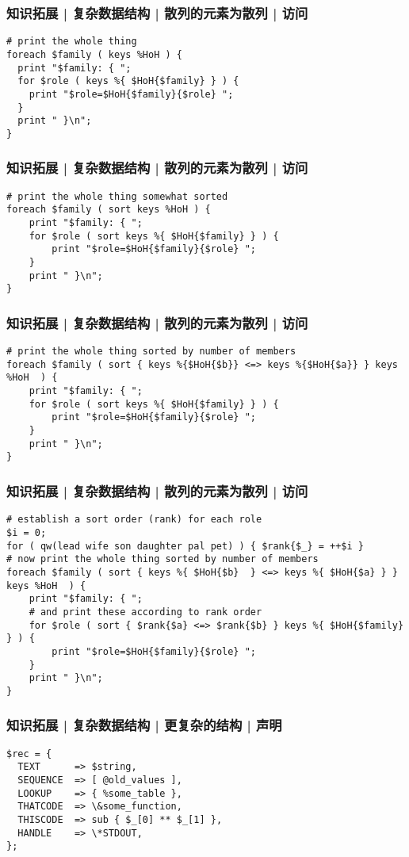 \begin{frame}[fragile]
  \frametitle{知识拓展 | 复杂数据结构 | 散列的元素为散列 | 访问}
\begin{lstlisting}
# print the whole thing
foreach $family ( keys %HoH ) {
  print "$family: { ";
  for $role ( keys %{ $HoH{$family} } ) {
    print "$role=$HoH{$family}{$role} ";
  }
  print " }\n";
}
\end{lstlisting}
\end{frame}

\begin{frame}[fragile]
  \frametitle{知识拓展 | 复杂数据结构 | 散列的元素为散列 | 访问}
\begin{lstlisting}
# print the whole thing somewhat sorted
foreach $family ( sort keys %HoH ) {
    print "$family: { ";
    for $role ( sort keys %{ $HoH{$family} } ) {
        print "$role=$HoH{$family}{$role} ";
    }
    print " }\n";
}
\end{lstlisting}
\end{frame}

\begin{frame}[fragile]
  \frametitle{知识拓展 | 复杂数据结构 | 散列的元素为散列 | 访问}
\begin{lstlisting}
# print the whole thing sorted by number of members
foreach $family ( sort { keys %{$HoH{$b}} <=> keys %{$HoH{$a}} } keys %HoH  ) {
    print "$family: { ";
    for $role ( sort keys %{ $HoH{$family} } ) {
        print "$role=$HoH{$family}{$role} ";
    }
    print " }\n";
}
\end{lstlisting}
\end{frame}

\begin{frame}[fragile]
  \frametitle{知识拓展 | 复杂数据结构 | 散列的元素为散列 | 访问}
\begin{lstlisting}
# establish a sort order (rank) for each role
$i = 0;
for ( qw(lead wife son daughter pal pet) ) { $rank{$_} = ++$i }
# now print the whole thing sorted by number of members
foreach $family ( sort { keys %{ $HoH{$b}  } <=> keys %{ $HoH{$a} } } keys %HoH  ) {
    print "$family: { ";
    # and print these according to rank order
    for $role ( sort { $rank{$a} <=> $rank{$b} } keys %{ $HoH{$family} } ) {
        print "$role=$HoH{$family}{$role} ";
    }
    print " }\n";
}
\end{lstlisting}
\end{frame}

\begin{frame}[fragile]
  \frametitle{知识拓展 | 复杂数据结构 | 更复杂的结构 | 声明}
\begin{lstlisting}
$rec = {
  TEXT      => $string,
  SEQUENCE  => [ @old_values ],
  LOOKUP    => { %some_table },
  THATCODE  => \&some_function,
  THISCODE  => sub { $_[0] ** $_[1] },
  HANDLE    => \*STDOUT,
};
\end{lstlisting}
\end{frame}


